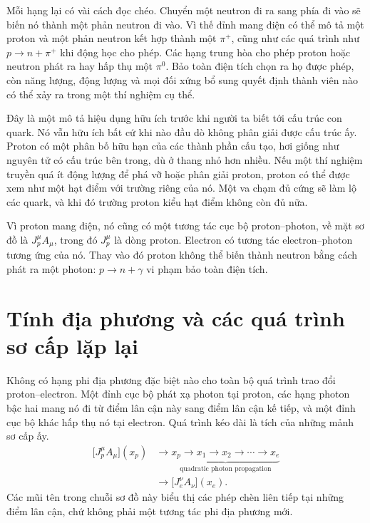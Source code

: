 Mỗi hạng lại có vài cách đọc chéo. Chuyển một neutron đi ra sang phía đi vào sẽ biến nó thành một phản neutron đi vào. Vì thế đỉnh mang điện có thể mô tả một proton và một phản neutron kết hợp thành một \(\pi^+\), cũng như các quá trình như \(p\to n+\pi^+\) khi động học cho phép. Các hạng trung hòa cho phép proton hoặc neutron phát ra hay hấp thụ một \(\pi^0\). Bảo toàn điện tích chọn ra họ được phép, còn năng lượng, động lượng và mọi đối xứng bổ sung quyết định thành viên nào có thể xảy ra trong một thí nghiệm cụ thể.

Đây là một mô tả hiệu dụng hữu ích trước khi người ta biết tới cấu trúc con quark. Nó vẫn hữu ích bất cứ khi nào đầu dò không phân giải được cấu trúc ấy. Proton có một phân bố hữu hạn của các thành phần cấu tạo, hơi giống như nguyên tử có cấu trúc bên trong, dù ở thang nhỏ hơn nhiều. Nếu một thí nghiệm truyền quá ít động lượng để phá vỡ hoặc phân giải proton, proton có thể được xem như một hạt điểm với trường riêng của nó. Một va chạm đủ cứng sẽ làm lộ các quark, và khi đó trường proton kiểu hạt điểm không còn đủ nữa.

Vì proton mang điện, nó cũng có một tương tác cục bộ proton--photon, về mặt sơ đồ là \(J_p^\mu A_\mu\), trong đó \(J_p^\mu\) là dòng proton. Electron có tương tác electron--photon tương ứng của nó. Thay vào đó proton không thể biến thành neutron bằng cách phát ra một photon: \(p\to n+\gamma\) vi phạm bảo toàn điện tích.

\begin{classroomqa}
\end{classroomqa}

\section{Tính địa phương và các quá trình sơ cấp lặp lại}

Không có hạng phi địa phương đặc biệt nào cho toàn bộ quá trình trao đổi proton--electron. Một đỉnh cục bộ phát xạ photon tại proton, các hạng photon bậc hai mang nó đi từ điểm lân cận này sang điểm lân cận kế tiếp, và một đỉnh cục bộ khác hấp thụ nó tại electron. Quá trình kéo dài là tích của những mảnh sơ cấp ấy.
\begin{equation}
\begin{aligned}
\bigl[J_p^\mu A_\mu\bigr](x_p)
&\longrightarrow
\underbrace{x_p\to x_1\to x_2\to\cdots\to x_e}_{\text{quadratic photon propagation}}
\\
&\longrightarrow
\bigl[J_e^\nu A_\nu\bigr](x_e).
\end{aligned}
\end{equation}
Các mũi tên trong chuỗi sơ đồ này biểu thị các phép chèn liên tiếp tại những điểm lân cận, chứ không phải một tương tác phi địa phương mới.

